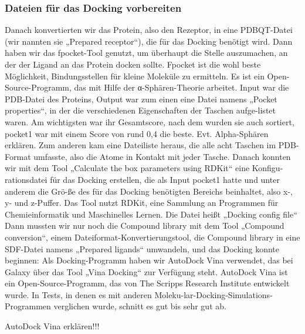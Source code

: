\documentclass[11pt]{article}
\begin{document}
{    \subsubsection{Dateien für das Docking vorbereiten}\label{subsec:dateien-für-das-docking-vorbereiten}

    Danach konvertierten wir das Protein, also den Rezeptor, in eine PDBQT-Datei (wir nannten sie „Prepared receptor“), die für das Docking benötigt wird.
    Dann haben wir das fpocket-Tool genutzt, um überhaupt die Stelle auszumachen, an der der Ligand an das Protein docken sollte. Fpocket ist die wohl beste Möglichkeit, Bindungsstellen für kleine Moleküle zu ermitteln. Es ist ein Open-Source-Programm, das mit Hilfe der α-Sphären-Theorie arbeitet. Input war die PDB-Datei des Proteins, Output war zum einen eine Datei namens „Pocket properties“, in der die verschiedenen Eigenschaften der Taschen aufge-listet waren. Am wichtigsten war ihr Gesamtscore, nach dem wurden sie auch sortiert, pocket1 war mit einem Score von rund 0,4 die beste.
    Evt. Alpha-Sphären erklären.
    Zum anderen kam eine Dateiliste heraus, die alle acht Taschen im PDB-Format umfasste, also die Atome in Kontakt mit jeder Tasche.
    Danach konnten wir mit dem Tool „Calculate the box parameters using RDKit“ eine Konfigu-rationsdatei für das Docking erstellen, die als Input pocket1 hatte und unter anderem die Grö-ße des für das Docking benötigten Bereichs beinhaltet, also x-, y- und z-Puffer. Das Tool nutzt RDKit, eine Sammlung an Programmen für Chemieinformatik und Maschinelles Lernen. Die Datei heißt „Docking config file“
    Dann mussten wir nur noch die Compound library mit dem Tool „Compound conversion“, einem Dateiformat-Konvertierungstool, die Compound library in eine SDF-Datei namens „Prepared ligands“ umwandeln, und das Docking konnte beginnen:
    Als Docking-Programm haben wir AutoDock Vina verwendet, das bei Galaxy über das Tool „Vina Docking“ zur Verfügung steht. AutoDock Vina ist ein Open-Source-Programm, das von The Scripps Research Institute entwickelt wurde. In Tests, in denen es mit anderen Moleku-lar-Docking-Simulations-Programmen verglichen wurde, schnitt es gut bis sehr gut ab.

    AutoDock Vina erklären!!!

}
\end{document}
